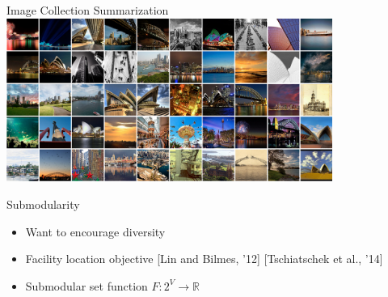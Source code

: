\documentclass[mathserif]{beamer}
\newcommand{\qcite}[1]{{\scriptsize\color{col2}[#1]}}
\begin{document}
\begin{frame}{Image Collection Summarization}
\vspace{0.5em}
\centering
\includegraphics[width=4.2in]{figures/flickr_probs_0.png}
\end{frame}

\begin{frame}{Submodularity}
\vspace{0.5em}
\begin{itemize}
\item<1-> Want to encourage diversity
\vspace{1em}
\item<2-> Facility location objective \qcite{Lin and Bilmes, '12} \qcite{Tschiatschek et al., '14}
\vspace{1em}
\item<3-> Submodular set function $F : 2^V \to \mathbb{R}$
\end{itemize}

\vspace{1em}
\centering
{}
\end{frame}
\end{document}
